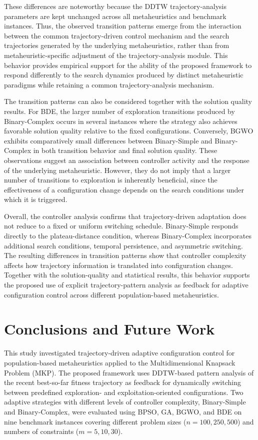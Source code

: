 \documentclass[journal,article,submit,moreauthors]{Definitions/mdpi}
\begin{document}
These differences are noteworthy because the DDTW trajectory-analysis
parameters are kept unchanged across all metaheuristics and benchmark
instances. Thus, the observed transition patterns emerge from the interaction
between the common trajectory-driven control mechanism and the search
trajectories generated by the underlying metaheuristics, rather than from
metaheuristic-specific adjustment of the trajectory-analysis module. This
behavior provides empirical support for the ability of the proposed
framework to respond differently to the search dynamics produced by distinct
metaheuristic paradigms while retaining a common trajectory-analysis
mechanism.

The transition patterns can also be considered together with the solution
quality results. For BDE, the larger number of exploration transitions
produced by Binary-Complex occurs in several instances where the strategy
also achieves favorable solution quality relative to the fixed
configurations. Conversely, BGWO exhibits comparatively small differences
between Binary-Simple and Binary-Complex in both transition behavior and
final solution quality. These observations suggest an association between
controller activity and the response of the underlying metaheuristic.
However, they do not imply that a larger number of transitions to exploration
is inherently beneficial, since the effectiveness of a configuration change
depends on the search conditions under which it is triggered.

Overall, the controller analysis confirms that trajectory-driven adaptation
does not reduce to a fixed or uniform switching schedule. Binary-Simple
responds directly to the plateau-distance condition, whereas Binary-Complex
incorporates additional search conditions, temporal persistence, and
asymmetric switching. The resulting differences in transition patterns show
that controller complexity affects how trajectory information is translated
into configuration changes. Together with the solution-quality and
statistical results, this behavior supports the proposed use of explicit
trajectory-pattern analysis as feedback for adaptive configuration control
across different population-based metaheuristics.


\section{Conclusions and Future Work}
\label{sec:conclusions}

This study investigated trajectory-driven adaptive configuration control for
population-based metaheuristics applied to the Multidimensional Knapsack
Problem (MKP). The proposed framework uses DDTW-based pattern analysis of
the recent best-so-far fitness trajectory as feedback for dynamically
switching between predefined exploration- and exploitation-oriented
configurations. Two adaptive strategies with different levels of controller
complexity, Binary-Simple and Binary-Complex, were evaluated using BPSO, GA,
BGWO, and BDE on nine benchmark instances covering different problem sizes
($n=100,250,500$) and numbers of constraints ($m=5,10,30$).
\end{document}
